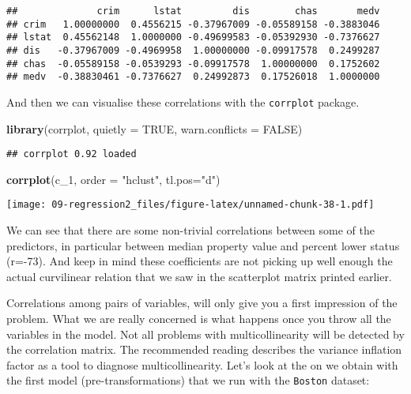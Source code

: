 \documentclass[
]{book}
\newenvironment{Shaded}{\begin{snugshade}}{\end{snugshade}}
\newcommand{\AttributeTok}[1]{\textcolor[rgb]{0.13,0.29,0.53}{#1}}
\newcommand{\ConstantTok}[1]{\textcolor[rgb]{0.56,0.35,0.01}{#1}}
\newcommand{\FunctionTok}[1]{\textcolor[rgb]{0.13,0.29,0.53}{\textbf{#1}}}
\newcommand{\NormalTok}[1]{#1}
\newcommand{\StringTok}[1]{\textcolor[rgb]{0.31,0.60,0.02}{#1}}
\begin{document}
\begin{verbatim}
##              crim      lstat         dis        chas       medv
## crim   1.00000000  0.4556215 -0.37967009 -0.05589158 -0.3883046
## lstat  0.45562148  1.0000000 -0.49699583 -0.05392930 -0.7376627
## dis   -0.37967009 -0.4969958  1.00000000 -0.09917578  0.2499287
## chas  -0.05589158 -0.0539293 -0.09917578  1.00000000  0.1752602
## medv  -0.38830461 -0.7376627  0.24992873  0.17526018  1.0000000
\end{verbatim}

And then we can visualise these correlations with the \texttt{corrplot} package.

\begin{Shaded}
\begin{Highlighting}[]
\FunctionTok{library}\NormalTok{(corrplot, }\AttributeTok{quietly =} \ConstantTok{TRUE}\NormalTok{, }\AttributeTok{warn.conflicts =} \ConstantTok{FALSE}\NormalTok{)}
\end{Highlighting}
\end{Shaded}

\begin{verbatim}
## corrplot 0.92 loaded
\end{verbatim}

\begin{Shaded}
\begin{Highlighting}[]
\FunctionTok{corrplot}\NormalTok{(c\_1, }\AttributeTok{order =} \StringTok{"hclust"}\NormalTok{, }\AttributeTok{tl.pos=}\StringTok{"d"}\NormalTok{)}
\end{Highlighting}
\end{Shaded}

\texttt{[image: 09-regression2\_files/figure-latex/unnamed-chunk-38-1.pdf]}

We can see that there are some non-trivial correlations between some of the predictors, in particular between median property value and percent lower status (r=-73). And keep in mind these coefficients are not picking up well enough the actual curvilinear relation that we saw in the scatterplot matrix printed earlier.

Correlations among pairs of variables, will only give you a first impression of the problem. What we are really concerned is what happens once you throw all the variables in the model. Not all problems with multicollinearity will be detected by the correlation matrix. The recommended reading describes the variance inflation factor as a tool to diagnose multicollinearity. Let's look at the on we obtain with the first model (pre-transformations) that we run with the \texttt{Boston} dataset:
\end{document}

